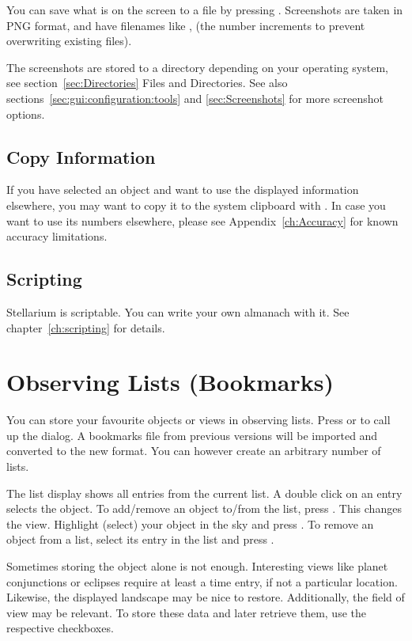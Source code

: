 You can save what is on the screen to a file by pressing
. Screenshots are taken in PNG format, and have filenames
like ,  (the number
increments to prevent overwriting existing files). 

The screenshots are stored to a directory depending on your operating
system, see section~\ref{sec:Directories} Files and Directories.  See
also sections~\ref{sec:gui:configuration:tools} and \ref{sec:Screenshots} for more screenshot options.

\subsection{Copy Information}
\label{sec:tour:copyInfo}

If you have selected an object and want to use the displayed
information elsewhere, you may want to copy it to the system clipboard
with . In case you want to use its numbers
elsewhere, please see Appendix~\ref{ch:Accuracy} for known accuracy
limitations.

\subsection{Scripting}
\label{sec:tour:export_data:scripting}

Stellarium is scriptable. You can write your own almanach with it. 
See chapter~\ref{ch:scripting} for details.


\section{Observing Lists (Bookmarks)}
\label{sec:tour:bookmarks}

You can store your favourite objects or views in observing lists. 
Press  or  to call
up the dialog.  A bookmarks file from previous versions will be
imported and converted to the new format. You can however create an
arbitrary number of lists. 

The list display shows all entries from the current list. A double
click on an entry selects the object.  To add/remove an object to/from the list,
press . This changes the view. Highlight (select)
your object in the sky and press . To remove an
object from a list, select its entry in the list and press
. 

Sometimes storing the object alone is not enough. Interesting views like
planet conjunctions or eclipses require at least a time entry, if not
a particular location. Likewise, the displayed landscape may be nice
to restore. Additionally, the field of view may be relevant. To store
these data and later retrieve them, use the respective checkboxes.

